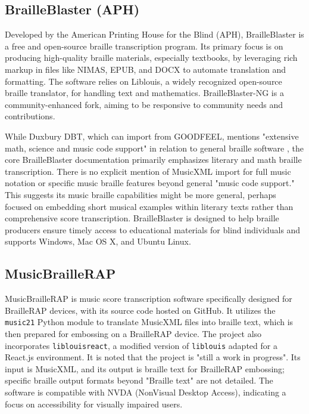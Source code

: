 \subsection{BrailleBlaster (APH)}
Developed by the American Printing House for the Blind (APH), BrailleBlaster is a free and open-source braille transcription program. \cite{aphtech-brailleblaster-ng, aph-brailleblaster, aphtech-brailleblaster-ng} Its primary focus is on producing high-quality braille materials, especially textbooks, by leveraging rich markup in files like NIMAS, EPUB, and DOCX to automate translation and formatting. \cite{aph-brailleblaster} The software relies on Liblouis, a widely recognized open-source braille translator, for handling text and mathematics. \cite{aph-brailleblaster} BrailleBlaster-NG is a community-enhanced fork, aiming to be responsive to community needs and contributions. \cite{aphtech-brailleblaster-ng}

While Duxbury DBT, which can import from GOODFEEL, mentions "extensive math, science and music code support" in relation to general braille software \cite{duxbury-dbt}, the core BrailleBlaster documentation primarily emphasizes literary and math braille transcription. \cite{aphtech-brailleblaster-ng, aph-brailleblaster} There is no explicit mention of MusicXML import for full music notation or specific music braille features beyond general "music code support." This suggests its music braille capabilities might be more general, perhaps focused on embedding short musical examples within literary texts rather than comprehensive score transcription. BrailleBlaster is designed to help braille producers ensure timely access to educational materials for blind individuals and supports Windows, Mac OS X, and Ubuntu Linux. \cite{aphtech-brailleblaster-ng, aph-brailleblaster}

\subsection{MusicBrailleRAP}
MusicBrailleRAP is music score transcription software specifically designed for BrailleRAP devices, with its source code hosted on GitHub. \cite{github-braillerap} It utilizes the \texttt{music21} Python module to translate MusicXML files into braille text, which is then prepared for embossing on a BrailleRAP device. \cite{github-braillerap} The project also incorporates \texttt{liblouisreact}, a modified version of \texttt{liblouis} adapted for a React.js environment. \cite{github-braillerap} It is noted that the project is "still a work in progress". \cite{github-braillerap} Its input is MusicXML, and its output is braille text for BrailleRAP embossing; specific braille output formats beyond "Braille text" are not detailed. \cite{github-braillerap} The software is compatible with NVDA (NonVisual Desktop Access), indicating a focus on accessibility for visually impaired users. \cite{github-braillerap}

